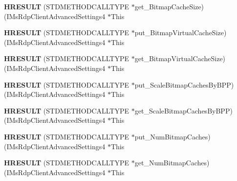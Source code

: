 \begin{DoxyCompactItemize}
{\bfseries H\+R\+E\+S\+U\+LT} (S\+T\+D\+M\+E\+T\+H\+O\+D\+C\+A\+L\+L\+T\+Y\+PE $\ast$get\+\_\+\+Bitmap\+Cache\+Size)(I\+Ms\+Rdp\+Client\+Advanced\+Settings4 $\ast$This
\item 
\mbox{\label{struct_i_ms_rdp_client_advanced_settings4_vtbl_a75b9d114f0408e9ed87db1a24fbc9214}} 
{\bfseries H\+R\+E\+S\+U\+LT} (S\+T\+D\+M\+E\+T\+H\+O\+D\+C\+A\+L\+L\+T\+Y\+PE $\ast$put\+\_\+\+Bitmap\+Virtual\+Cache\+Size)(I\+Ms\+Rdp\+Client\+Advanced\+Settings4 $\ast$This
\item 
\mbox{\label{struct_i_ms_rdp_client_advanced_settings4_vtbl_ae0f8388d08dbb1befcd9d616bea58832}} 
{\bfseries H\+R\+E\+S\+U\+LT} (S\+T\+D\+M\+E\+T\+H\+O\+D\+C\+A\+L\+L\+T\+Y\+PE $\ast$get\+\_\+\+Bitmap\+Virtual\+Cache\+Size)(I\+Ms\+Rdp\+Client\+Advanced\+Settings4 $\ast$This
\item 
\mbox{\label{struct_i_ms_rdp_client_advanced_settings4_vtbl_a7631f06eb0ed2900cde5c01ed96a796d}} 
{\bfseries H\+R\+E\+S\+U\+LT} (S\+T\+D\+M\+E\+T\+H\+O\+D\+C\+A\+L\+L\+T\+Y\+PE $\ast$put\+\_\+\+Scale\+Bitmap\+Caches\+By\+B\+PP)(I\+Ms\+Rdp\+Client\+Advanced\+Settings4 $\ast$This
\item 
\mbox{\label{struct_i_ms_rdp_client_advanced_settings4_vtbl_a6b153e150b7fb092049f94e44d00c579}} 
{\bfseries H\+R\+E\+S\+U\+LT} (S\+T\+D\+M\+E\+T\+H\+O\+D\+C\+A\+L\+L\+T\+Y\+PE $\ast$get\+\_\+\+Scale\+Bitmap\+Caches\+By\+B\+PP)(I\+Ms\+Rdp\+Client\+Advanced\+Settings4 $\ast$This
\item 
\mbox{\label{struct_i_ms_rdp_client_advanced_settings4_vtbl_ac69257bd6408ddadf4650d777585525a}} 
{\bfseries H\+R\+E\+S\+U\+LT} (S\+T\+D\+M\+E\+T\+H\+O\+D\+C\+A\+L\+L\+T\+Y\+PE $\ast$put\+\_\+\+Num\+Bitmap\+Caches)(I\+Ms\+Rdp\+Client\+Advanced\+Settings4 $\ast$This
\item 
\mbox{\label{struct_i_ms_rdp_client_advanced_settings4_vtbl_a333c7e056276e5323af6e4e3deaced1a}} 
{\bfseries H\+R\+E\+S\+U\+LT} (S\+T\+D\+M\+E\+T\+H\+O\+D\+C\+A\+L\+L\+T\+Y\+PE $\ast$get\+\_\+\+Num\+Bitmap\+Caches)(I\+Ms\+Rdp\+Client\+Advanced\+Settings4 $\ast$This

\end{DoxyCompactItemize}
